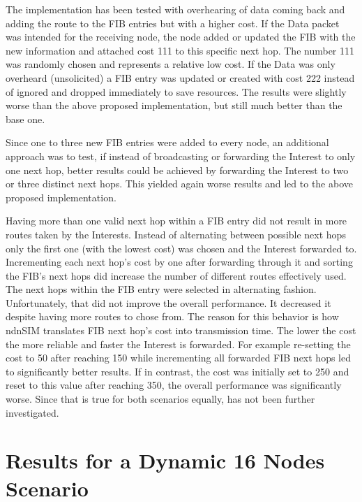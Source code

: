 The implementation has been tested with overhearing of data coming back and adding the route to the FIB entries but with a higher cost. If the Data packet was intended for the receiving node, the node added or updated the FIB with the new information and attached cost 111 to this specific next hop. The number 111 was randomly chosen and represents a relative low cost. If the Data was only overheard (unsolicited) a FIB entry was updated or created with cost 222 instead of ignored and dropped immediately to save resources. The results were slightly worse than the above proposed implementation, but still much better than the base one.

\vspace{5mm} %

Since one to three new FIB entries were added to every node, an additional approach was to test, if instead of broadcasting or forwarding the Interest to only one next hop, better results could be achieved by forwarding the Interest to two or three distinct next hops. This yielded again worse results and led to the above proposed implementation.

\vspace{5mm} %

Having more than one valid next hop within a FIB entry did not result in more routes taken by the Interests. Instead of alternating between possible next hops only the first one (with the lowest cost) was chosen and the Interest forwarded to. Incrementing each next hop's cost by one after forwarding through it and sorting the FIB's next hops did increase the number of different routes effectively used. The next hops within the FIB entry were selected in alternating fashion. Unfortunately, that did not improve the overall performance. It decreased it despite having more routes to chose from. The reason for this behavior is how ndnSIM translates FIB next hop's cost into transmission time. The lower the cost the more reliable and faster the Interest is forwarded. For example re-setting the cost to 50 after reaching 150 while incrementing all forwarded FIB next hops led to significantly better results. If in contrast, the cost was initially set to 250 and reset to this value after reaching 350, the overall performance was significantly worse. Since that is true for both scenarios equally, has not been further investigated.

\section{Results for a Dynamic 16 Nodes Scenario}

